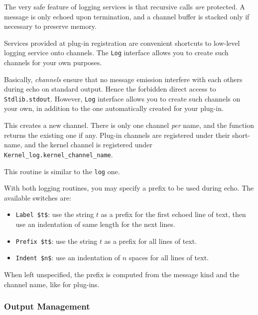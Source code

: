 The very safe feature of logging services is that recursive calls
\emph{are} protected. A message is only echoed upon termination,
and a channel buffer is stacked only if necessary to preserve memory.

Services provided at plug-in registration are convenient shortcuts to
low-level logging service onto channels. The \lstinline{Log} interface
allows you to create such channels for your own purposes.

Basically, \emph{channels} ensure that no message emission interfere
with each others during echo on standard output. Hence the forbidden
direct access to \lstinline{Stdlib.stdout}. However,
\lstinline{Log} interface allows you to create such channels on your
own, in addition to the one automatically created for your plug-in.

\begin{description}
  This creates a new channel. There is only one channel \emph{per}
  name, and the function returns the existing one if
  any. Plug-in channels are registered under their short-name, and the kernel
  channel is registered under \lstinline{Kernel_log.kernel_channel_name}.

  This routine is similar to the \lstinline{log} one.

\end{description}

With both logging routines, you may specify a prefix to be used during
echo. The available switches are:
\begin{itemize}
\item[] \lstinline|Label $t$|: use the string $t$ as a prefix for the
  first echoed line of text, then use an indentation of same length
  for the next lines.
\item[] \lstinline|Prefix $t$|: use the string $t$ as a prefix for all
  lines of text.
\item[] \lstinline|Indent $n$|: use an indentation of $n$ spaces for
  all lines of text.
\end{itemize}

When left unspecified, the prefix is computed from the message kind
and the channel name, like for plug-ins.

\subsubsection{Output Management}

